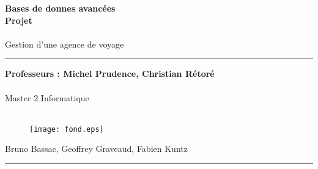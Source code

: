 \documentclass[a4paper]{article}
\newlength{\larg}
\begin{document}
\thispagestyle{empty}

\setlength{\unitlength}{1in}



\begin{flushright}
 \noindent {\rule{\larg}{0.5mm}}
\end{flushright}
\vspace{7mm}
\begin{flushright}
 \Huge{\bf Bases de donnes avanc\'ees} \\
 \Huge{\bf Projet} \\
 ~\\
 \huge{Gestion d'une agence de voyage}\\
\end{flushright}
\vspace{7mm}
\begin{flushright}
 {\rule{\larg}{0.5mm}}
\end{flushright}
\vspace{2mm}
\begin{flushright}
 \large{\bf Professeurs : Michel Prudence, Christian R\'etor\'e} \\
 ~\\
 \large{Master 2 Informatique}\\
 ~\\

\begin{figure}[ht]
\begin{center}
\texttt{[image: fond.eps]}
\end{center}
\end{figure}



 \large{Bruno Bassac, Geoffrey Graveaud, Fabien Kuntz}
{\rule{\larg}{0.5mm}}
\end{flushright}

\newpage

\addtolength{\oddsidemargin}{1cm}

\thispagestyle{empty}
\tableofcontents
\newpage

\setcounter{page}{1}











\end{document}

